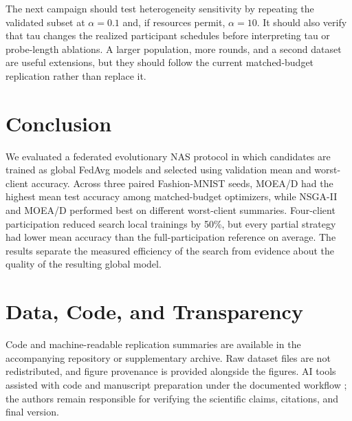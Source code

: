 \documentclass[11pt]{article}
\begin{document}
The next campaign should test heterogeneity sensitivity by repeating the validated subset at $\alpha=0.1$ and, if resources permit, $\alpha=10$. It should also verify that tau changes the realized participant schedules before interpreting tau or probe-length ablations. A larger population, more rounds, and a second dataset are useful extensions, but they should follow the current matched-budget replication rather than replace it.

\section{Conclusion}

We evaluated a federated evolutionary NAS protocol in which candidates are trained as global FedAvg models and selected using validation mean and worst-client accuracy. Across three paired Fashion-MNIST seeds, MOEA/D had the highest mean test accuracy among matched-budget optimizers, while NSGA-II and MOEA/D performed best on different worst-client summaries. Four-client participation reduced search local trainings by 50\%, but every partial strategy had lower mean accuracy than the full-participation reference on average. The results separate the measured efficiency of the search from evidence about the quality of the resulting global model.

\section*{Data, Code, and Transparency}

Code and machine-readable replication summaries are available in the accompanying repository or supplementary archive. Raw dataset files are not redistributed, and figure provenance is provided alongside the figures. AI tools assisted with code and manuscript preparation under the documented workflow \cite{kassis2026}; the authors remain responsible for verifying the scientific claims, citations, and final version.
\end{document}
